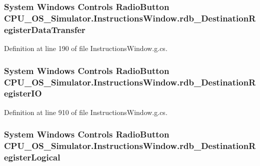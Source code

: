 \subsubsection[{rdb\+\_\+\+Destination\+Register\+Data\+Transfer}]{\setlength{\rightskip}{0pt plus 5cm}System Windows Controls Radio\+Button C\+P\+U\+\_\+\+O\+S\+\_\+\+Simulator.\+Instructions\+Window.\+rdb\+\_\+\+Destination\+Register\+Data\+Transfer\hspace{0.3cm}{\ttfamily [package]}}\label{class_c_p_u___o_s___simulator_1_1_instructions_window_a00e9e3013355f592d97a38b29e94899c}


Definition at line 190 of file Instructions\+Window.\+g.\+cs.

\hypertarget{class_c_p_u___o_s___simulator_1_1_instructions_window_a507ebe0998697ce8b2345fac2d9498a1}{}
\subsubsection[{rdb\+\_\+\+Destination\+Register\+I\+O}]{\setlength{\rightskip}{0pt plus 5cm}System Windows Controls Radio\+Button C\+P\+U\+\_\+\+O\+S\+\_\+\+Simulator.\+Instructions\+Window.\+rdb\+\_\+\+Destination\+Register\+I\+O\hspace{0.3cm}{\ttfamily [package]}}\label{class_c_p_u___o_s___simulator_1_1_instructions_window_a507ebe0998697ce8b2345fac2d9498a1}


Definition at line 910 of file Instructions\+Window.\+g.\+cs.

\hypertarget{class_c_p_u___o_s___simulator_1_1_instructions_window_a3670f5971b586bd8977a78bcde185a35}{}
\subsubsection[{rdb\+\_\+\+Destination\+Register\+Logical}]{\setlength{\rightskip}{0pt plus 5cm}System Windows Controls Radio\+Button C\+P\+U\+\_\+\+O\+S\+\_\+\+Simulator.\+Instructions\+Window.\+rdb\+\_\+\+Destination\+Register\+Logical\hspace{0.3cm}{\ttfamily [package]}}\label{class_c_p_u___o_s___simulator_1_1_instructions_window_a3670f5971b586bd8977a78bcde185a35}


